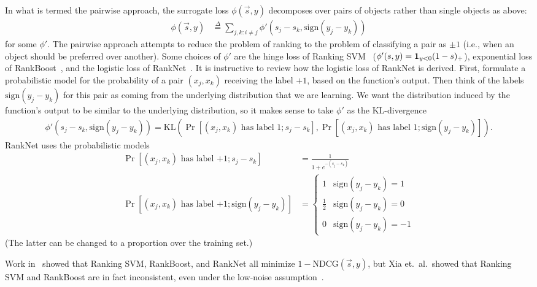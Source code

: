 In what is termed the pairwise approach, the surrogate loss
$\phi(\vec{s}, y)$ decomposes over pairs of objects rather than single objects
as above:
\begin{align*}
  \phi(\vec{s}, y)
  &\stackrel{\Delta}{=}
  \sum_{j,k : i \neq j} \phi'(s_j - s_k, \text{sign}(y_j - y_k)) 
\end{align*}
for some $\phi'$.
The pairwise approach attempts to reduce the problem of
ranking to the problem of classifying a pair as $\pm 1$ (i.e.,
when an object should be preferred over another). Some choices of $\phi'$
are the hinge loss of Ranking SVM~\cite{ranksvm}
($\phi'(s, y) = {\mathbf 1}_{y < 0}(1 - s)_+$),
exponential loss of RankBoost~\cite{rankboost},
and the logistic loss of RankNet~\cite{}.
It is instructive to review how the logistic loss of RankNet is derived.
First, formulate a probabilistic model for the probability
of a pair $(x_j, x_k)$ receiving the label $+1$, based on the function's
output. Then think of the labels $\text{sign}(y_j - y_k)$
for this pair as coming from the underlying distribution that we are learning.
We want the distribution induced by the function's output to be similar to the
underlying distribution, so it makes sense to take $\phi'$ as the KL-divergence
\begin{align*}
  \phi'(s_j - s_k, \text{sign}(y_j - y_k))
  = \text{KL}(\Pr[\text{$(x_j, x_k)$ has label $1$} ; s_j - s_k], \Pr[\text{$(x_j, x_k)$ has label $1$} ; \text{sign}(y_j - y_k)]).
\end{align*}
RankNet uses the probabilistic models
\begin{align*}
  \Pr[\text{$(x_j, x_k)$ has label $+1$}; s_j - s_k] &= \frac{1}{1 + e^{-(s_j - s_k)}} \\
  \Pr[\text{$(x_j, x_k)$ has label $+1$} ; \text{sign}(y_j - y_k)] &=
  \begin{cases}
    1 & \text{sign}(y_j - y_k) = 1 \\
    \frac{1}{2} & \text{sign}(y_j - y_k) = 0 \\
    0 & \text{sign}(y_j - y_k) = -1
  \end{cases}
\end{align*}
(The latter can be changed to a proportion over the training set.)

Work in~\cite{ranking-measures-and-loss-functions} showed that Ranking SVM,
RankBoost, and RankNet all minimize $1 - \text{NDCG}(\vec{s}, y)$, but
Xia et.\ al.\ showed that Ranking SVM and RankBoost are in fact inconsistent,
even under the low-noise assumption~\cite{xia2008listwise}. 

